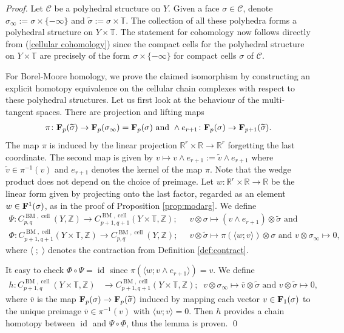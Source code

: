 \documentclass[11pt]{article}
\numberwithin{equation}{numsection}
\newcommand{\Z}{{\mathbb Z}}
\newcommand{\CC}{{\mathcal C}}
\newcommand{\R}{{\mathbb R}}
\newcommand{\T}{{\mathbb T}}
\DeclareMathOperator{\id}{id}
\DeclareMathOperator{\BM}{BM}
\DeclareMathOperator{\cell}{cell}
\begin{document}
\begin{proof}
Let $\CC$ be a polyhedral structure on $Y$. 
Given a face $\sigma \in \CC$, denote $\sigma_\infty := \sigma \times \{-\infty\}$ and $\widetilde{\sigma} := \sigma \times \T$.
The collection of all these polyhedra forms a polyhedral structure on $Y \times \T$. 
The statement for cohomology now follows directly from (\ref{cellular cohomology}) since the 
compact cells for the polyhedral structure on $Y \times \T$ are precisely of the form $\sigma \times \{- \infty\}$ for 
compact cells $\sigma$ of $\CC$.

For Borel-Moore homology, 
we prove the claimed isomorphism  by constructing
an explicit homotopy equivalence on the cellular chain complexes with respect to these polyhedral structures. 
Let us first look at the behaviour of the multi-tangent spaces. There are projection and lifting maps 
\begin{align*}
\pi  \colon {\bf F}_p(\widetilde{\sigma}) \to {\bf F}_p(\sigma_\infty) = {\bf F}_p(\sigma) 
\text{ and }
 \wedge e_{r+1} \colon {\bf F}_p(\sigma) \to {\bf F}_{p+1}(\widetilde{\sigma}). 
\end{align*}
The map $\pi$ is induced by the linear projection $\R^r \times \R \to \R^r$ forgetting the last coordinate. 
The second map is given by   $v\mapsto v \wedge e_{r+1} := \widetilde{v} \wedge e_{r+1}$ where $\widetilde{v} \in \pi^{-1}(v)$
and $e_{r+1}$ denotes the kernel of the map $\pi$.  
Note that the wedge product does not depend on the choice of preimage. 
Let $w \colon \R^r \times \R \to \R$ be  the linear form  
given by projecting onto the last factor,
regarded as an element $w \in  {\bf F}^1(\sigma)$, as in the proof of Proposition \ref{prop:modarg}. 
We define	
\begin{align*} 
\Psi \colon C_{p,q}^{\BM, \cell}(Y,\Z) \to C_{p+1,q+1}^{\BM, \cell}(Y\times \T,\Z); \;\;
&v \otimes \sigma \mapsto (v \wedge e_{r+1}) \otimes \widetilde{\sigma}
\text{ and } \\
\Phi \colon C_{p+1,q+1}^{\BM, \cell}(Y\times \T,\Z) \to C_{p,q}^{\BM, \cell}(Y,\Z);  \;\;
&v \otimes \widetilde{\sigma} \mapsto \pi(\langle w; v \rangle) \otimes \sigma \text{ and }
v \otimes \sigma_\infty \mapsto 0, 
\end{align*}
where  
$\langle \; ; \; \rangle$ denotes the contraction from Definition \ref{def:contract}.


It easy to check $\Phi \circ \Psi = \id$ since $\pi(\langle w; v \wedge e_{r+1} \rangle)=v$.
We define
\begin{align*} 
h \colon C_{p+1,q}^{\BM, \cell}(Y\times \T, \Z) &\to C_{p+1,q+1}^{\BM, \cell}(Y\times \T, \Z); \;\; 
v \otimes \sigma_\infty \mapsto \overline{v} \otimes \widetilde{\sigma} \text{ and } 
v \otimes \widetilde{\sigma}  \mapsto 0,
\end{align*}
where $\overline{v}$ is the map ${\bf F}_p(\sigma) \to {\bf F}_p(\widetilde{\sigma})$ induced by
mapping each vector $v \in {\bf F}_1(\sigma)$ to the unique preimage $\overline{v} \in \pi^{-1}(v)$
with $\langle w ; v \rangle = 0$. 
Then $h$ provides a chain homotopy between
$\id$ and $\Psi \circ \Phi$, thus the lemma is proven. 
\qed
\end{proof}
\end{document}

